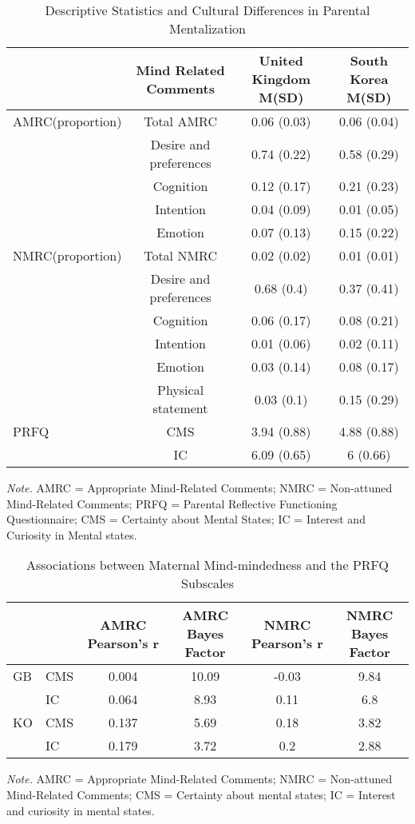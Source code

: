 \documentclass[
]{article}
\begin{document}
\begin{table}[H]

\caption{\label{tab:table2}Descriptive Statistics and Cultural Differences in Parental Mentalization}
\centering
\begin{tabular}[t]{lccc}
\toprule
\textbf{ } & \textbf{Mind Related Comments} & \textbf{United Kingdom M(SD)} & \textbf{South Korea M(SD)}\\
\midrule
AMRC(proportion) & Total AMRC & 0.06 (0.03) & 0.06 (0.04)\\
 & Desire and preferences & 0.74 (0.22) & 0.58 (0.29)\\
 & Cognition & 0.12 (0.17) & 0.21 (0.23)\\
 & Intention & 0.04 (0.09) & 0.01 (0.05)\\
 & Emotion & 0.07 (0.13) & 0.15 (0.22)\\
\addlinespace
NMRC(proportion) & Total NMRC & 0.02 (0.02) & 0.01 (0.01)\\
 & Desire and preferences & 0.68 (0.4) & 0.37 (0.41)\\
 & Cognition & 0.06 (0.17) & 0.08 (0.21)\\
 & Intention & 0.01 (0.06) & 0.02 (0.11)\\
 & Emotion & 0.03 (0.14) & 0.08 (0.17)\\
\addlinespace
 & Physical statement & 0.03 (0.1) & 0.15 (0.29)\\
PRFQ & CMS & 3.94 (0.88) & 4.88 (0.88)\\
 & IC & 6.09 (0.65) & 6 (0.66)\\
\bottomrule
\end{tabular}
\end{table}

\emph{Note.} AMRC = Appropriate Mind-Related Comments; NMRC = Non-attuned Mind-Related Comments; PRFQ = Parental Reflective Functioning Questionnaire; CMS = Certainty about Mental States; IC = Interest and Curiosity in Mental states.

\newpage

\begin{table}[H]

\caption{\label{tab:Table3prep}Associations between Maternal Mind-mindedness and the PRFQ Subscales}
\centering
\fontsize{9}{11}\selectfont
\begin{tabular}[t]{llcccc}
\toprule
\textbf{ } & \textbf{  } & \textbf{AMRC Pearson's r} & \textbf{AMRC Bayes Factor} & \textbf{NMRC Pearson's r} & \textbf{NMRC Bayes Factor}\\
\midrule
GB & CMS & 0.004 & 10.09 & -0.03 & 9.84\\
 & IC & 0.064 & 8.93 & 0.11 & 6.8\\
KO & CMS & 0.137 & 5.69 & 0.18 & 3.82\\
 & IC & 0.179 & 3.72 & 0.2 & 2.88\\
\bottomrule
\end{tabular}
\end{table}

\emph{Note.} AMRC = Appropriate Mind-Related Comments; NMRC = Non-attuned Mind-Related Comments; CMS = Certainty about mental states; IC = Interest and curiosity in mental states.
\end{document}
